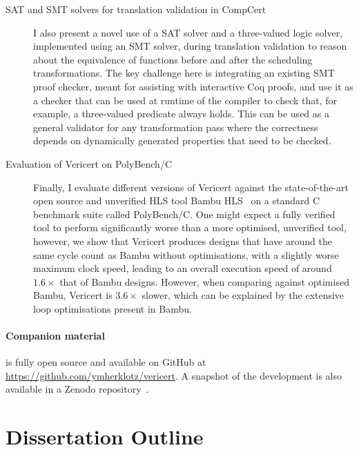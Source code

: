 \begin{description}
\item[SAT and SMT solvers for translation validation in CompCert] I also present
  a novel use of a \gls{SAT} solver and a three-valued logic solver, implemented
  using an \gls{SMT} solver, during translation validation to reason about the
  equivalence of functions before and after the scheduling transformations.  The
  key challenge here is integrating an existing \gls{SMT} proof checker, meant
  for assisting with interactive Coq proofs, and use it as a checker that can be
  used at runtime of the compiler to check that, for example, a three-valued
  predicate always holds.  This can be used as a general validator for any
  transformation pass where the correctness depends on dynamically generated
  properties that need to be checked.


\item[Evaluation of Vericert on PolyBench/C] Finally, I evaluate different
  versions of Vericert against the state-of-the-art open source and unverified
  \gls{HLS} tool Bambu HLS~\cite{pilato13_bambu} on a standard C benchmark suite
  called PolyBench/C.  One might expect a fully verified tool to perform
  significantly worse than a more optimised, unverified tool, however, we show
  that Vericert produces designs that have around the same cycle count as Bambu
  without optimisations, with a slightly worse maximum clock speed, leading to
  an overall execution speed of around $1.6\times$ that of Bambu designs.
  However, when comparing against optimised Bambu, Vericert is $3.6\times$
  slower, which can be explained by the extensive loop optimisations present in
  Bambu.
\end{description}

\paragraph{Companion material}
\vericert{} is fully open source and available on GitHub at
\url{https://github.com/ymherklotz/vericert}. A snapshot of the \vericert{}
development is also available in a Zenodo
repository~\cite{herklotz21_v}.

\section{Dissertation Outline}

